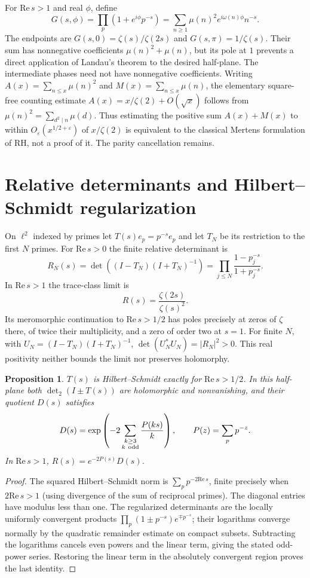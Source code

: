\documentclass[11pt,a4paper]{article}
\newtheorem{proposition}{Proposition}[section]
\theoremstyle{definition}\newtheorem{definition}[proposition]{Definition}
\theoremstyle{remark}\newtheorem{remark}[proposition]{Remark}
\begin{document}
For $\mathrm{Re}\,s>1$ and real $\phi$, define
\[
G(s,\phi)=\prod_p(1+e^{i\phi}p^{-s})
=\sum_{n\ge1}\mu(n)^2e^{i\omega(n)\phi}n^{-s}.
\]
The endpoints are $G(s,0)=\zeta(s)/\zeta(2s)$ and
$G(s,\pi)=1/\zeta(s)$. Their sum has nonnegative coefficients
$\mu(n)^2+\mu(n)$, but its pole at $1$ prevents a direct application of Landau's theorem to the desired half-plane. The intermediate phases need not have nonnegative coefficients.
Writing $A(x)=\sum_{n\le x}\mu(n)^2$ and $M(x)=\sum_{n\le x}\mu(n)$, the elementary square-free counting estimate
$A(x)=x/\zeta(2)+O(\sqrt{x})$ follows from
$\mu(n)^2=\sum_{d^2\mid n}\mu(d)$.
Thus estimating the positive sum $A(x)+M(x)$ to within
$O_\varepsilon(x^{1/2+\varepsilon})$ of $x/\zeta(2)$ is equivalent to the classical Mertens formulation of RH, not a proof of it. The parity cancellation remains.

\section{Relative determinants and Hilbert--Schmidt regularization}
On $\ell^2$ indexed by primes let $T(s)e_p=p^{-s}e_p$ and let $T_N$ be its restriction to the first $N$ primes. For $\mathrm{Re}\,s>0$ the finite relative determinant is
\[
R_N(s)=\det((I-T_N)(I+T_N)^{-1})
=\prod_{j\le N}\frac{1-p_j^{-s}}{1+p_j^{-s}}.
\]
In $\mathrm{Re}\,s>1$ the trace-class limit is
\[
R(s)=\frac{\zeta(2s)}{\zeta(s)^2}.
\]
Its meromorphic continuation to $\mathrm{Re}\,s>1/2$ has poles precisely at zeros of $\zeta$ there, of twice their multiplicity, and a zero of order two at $s=1$. For finite $N$, with $U_N=(I-T_N)(I+T_N)^{-1}$,
$\det(U_N^*U_N)=|R_N|^2>0$. This real positivity neither bounds the limit nor preserves holomorphy.

\begin{proposition}
$T(s)$ is Hilbert--Schmidt exactly for $\mathrm{Re}\,s>1/2$. In this half-plane both $\det_2(I\pm T(s))$ are holomorphic and nonvanishing, and their quotient $D(s)$ satisfies
\[
D(s)=\exp\left(-2\sum_{\substack{k\ge3\\ k\ {\rm odd}}}
\frac{P(ks)}{k}\right),\qquad P(z)=\sum_p p^{-z}.
\]
In $\mathrm{Re}\,s>1$, $R(s)=e^{-2P(s)}D(s)$.
\end{proposition}
\begin{proof}
The squared Hilbert--Schmidt norm is $\sum_p p^{-2\mathrm{Re}\,s}$, finite precisely when $2\mathrm{Re}\,s>1$ (using divergence of the sum of reciprocal primes). The diagonal entries have modulus less than one. The regularized determinants are the locally uniformly convergent products
$\prod_p(1\pm p^{-s})e^{\mp p^{-s}}$; their logarithms converge normally by the quadratic remainder estimate on compact subsets. Subtracting the logarithms cancels even powers and the linear term, giving the stated odd-power series. Restoring the linear term in the absolutely convergent region proves the last identity.
\end{proof}
\end{document}
